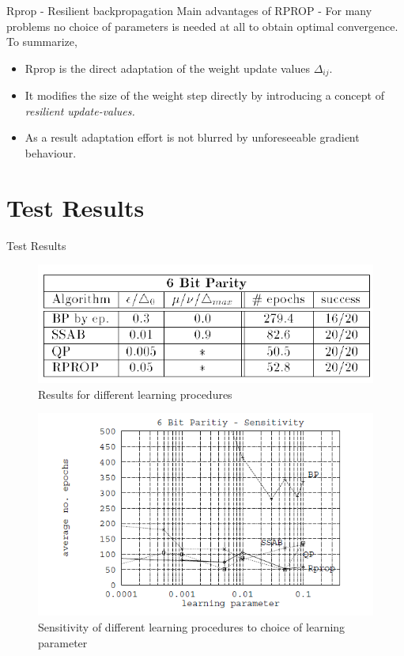 \documentclass{beamer}
\begin{document}
\begin{frame}{Rprop - Resilient backpropagation}
Main advantages of RPROP - For many problems no choice of parameters is needed at all to obtain optimal convergence. \\

\vspace{3mm}
To summarize,
\vspace{3mm}

\begin{itemize}
\item Rprop is the direct adaptation of the weight update values $ \Delta_{ij}. $ 
\item It modifies the size of the weight step directly by introducing a concept of \textit{resilient update-values.} 
\item As a result adaptation effort is not blurred by unforeseeable gradient behaviour. 
\end{itemize}

\end{frame}

\section{Test Results}
\begin{frame}{Test Results}
\begin{figure}
\centering
\includegraphics[width=0.45\linewidth]{3bitparity}
\caption{\small{Results for different learning procedures}}
\label{fig:3bitparity}
\end{figure}

\begin{figure}
	\centering
	\includegraphics[width=0.5\linewidth]{3bitparity_sensitivity}
	\caption{\small {Sensitivity of different learning procedures to choice of learning parameter}}
	\label{fig:3bitparity}
\end{figure}

\end{frame}
\end{document}

